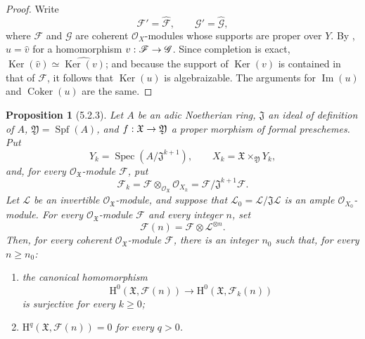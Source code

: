 \documentclass[oneside]{amsart}
\theoremstyle{ega-env-style}
\theoremstyle{ega-thm-env-style}
\newtheorem*{proposition}{Proposition}
\theoremstyle{ega-defn-env-style}
\def\mathcal{\mathscr}
\def\sh{\mathcal}                   %
\def\geq{\geqslant}                 %
\def\HH{\mathrm{H}}                 %
\def\Ker{\operatorname{Ker}}
\def\Im{\operatorname{Im}}
\def\Coker{\operatorname{Coker}}
\def\Spec{\operatorname{Spec}}
\def\Spf{\operatorname{Spf}}
\renewcommand{\to}{\mathchoice{\longrightarrow}{\rightarrow}{\rightarrow}{\rightarrow}}
\let\EGAOriginalLabel\label
\renewcommand{\label}[1]{\phantomsection\EGAOriginalLabel{#1}}
\begin{document}
\begin{proof}
Write
\[
  \sh{F}'=\widehat{\sh{F}},\qquad
  \sh{G}'=\widehat{\sh{G}},
\]
where $\sh{F}$ and $\sh{G}$ are coherent $\sh{O}_X$-modules whose
supports are proper over $Y$.  By ,
$u=\widehat{v}$ for a homomorphism
$v:\sh{F}\to\sh{G}$.  Since completion is exact,
$\Ker(\widehat{v})\simeq\widehat{\Ker(v)}$; and because the support
of $\Ker(v)$ is contained in that of $\sh{F}$, it follows that
$\Ker(u)$ is algebraizable.  The arguments for $\Im(u)$ and
$\Coker(u)$ are the same.
\end{proof}

\begin{proposition}[5.2.3]
\label{III.5.2.3}
Let $A$ be an adic Noetherian ring, $\mathfrak{J}$ an ideal of
definition of $A$, $\mathfrak{Y}=\Spf(A)$, and
$f:\mathfrak{X}\to\mathfrak{Y}$ a proper morphism of formal
preschemes.  Put
\[
  Y_k=\Spec(A/\mathfrak{J}^{k+1}),\qquad
  X_k=\mathfrak{X}\times_{\mathfrak{Y}}Y_k,
\]
and, for every $\sh{O}_{\mathfrak{X}}$-module $\sh{F}$, put
\[
  \sh{F}_k
  =
  \sh{F}\otimes_{\sh{O}_{\mathfrak{X}}}\sh{O}_{X_k}
  =
  \sh{F}/\mathfrak{J}^{k+1}\sh{F}.
\]
Let $\sh{L}$ be an invertible $\sh{O}_{\mathfrak{X}}$-module, and
suppose that
$\sh{L}_0=\sh{L}/\mathfrak{J}\sh{L}$ is an ample
$\sh{O}_{X_0}$-module.  For every
$\sh{O}_{\mathfrak{X}}$-module $\sh{F}$ and every integer $n$, set
\[
  \sh{F}(n)=\sh{F}\otimes\sh{L}^{\otimes n}.
\]
Then, for every coherent $\sh{O}_{\mathfrak{X}}$-module $\sh{F}$,
there is an integer $n_0$ such that, for every $n\geq n_0$:
\begin{enumerate}
  \item[\rm{(i)}] the canonical homomorphism
    \[
      \HH^0(\mathfrak{X},\sh{F}(n))
      \longrightarrow
      \HH^0(\mathfrak{X},\sh{F}_k(n))
    \]
    is surjective for every $k\geq0$;
  \item[\rm{(ii)}]
    $\HH^q(\mathfrak{X},\sh{F}(n))=0$ for every $q>0$.
\end{enumerate}
\end{proposition}
\end{document}
